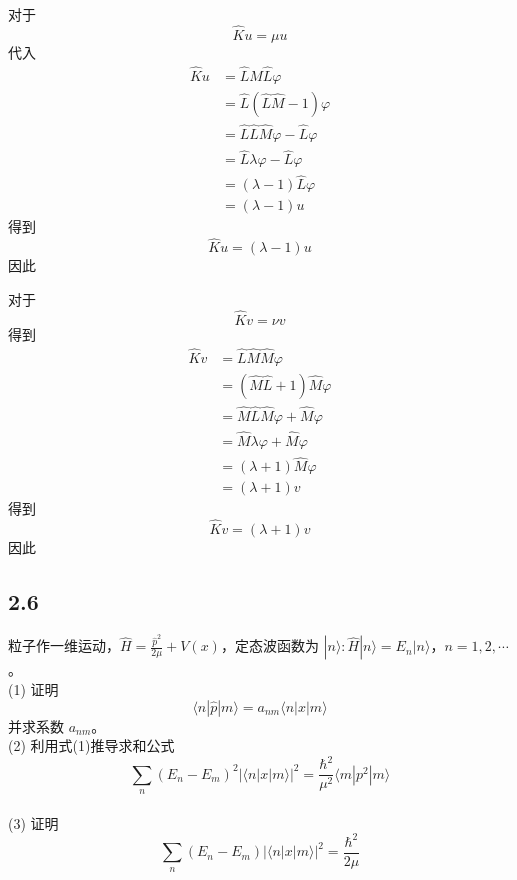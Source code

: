 对于
\begin{equation}
    \hat{K}u=\mu u
\end{equation}
代入
\begin{equation}
    \begin{aligned}
        \hat{K}u&=\hat{L}\hat{M}\hat{L}\varphi 
\\
&=\hat{L}\left( \hat{L}\hat{M}-1 \right) \varphi 
\\
&=\hat{L}\hat{L}\hat{M}\varphi -\hat{L}\varphi 
\\
&=\hat{L}\lambda \varphi -\hat{L}\varphi 
\\
&=\left( \lambda -1 \right) \hat{L}\varphi 
\\
&=\left( \lambda -1 \right) u
    \end{aligned}
\end{equation}
得到
\begin{equation}
    \hat{K}u=\left( \lambda -1 \right) u
\end{equation}
因此

对于
\begin{equation}
    \hat{K}v=\nu v
\end{equation}
得到
\begin{equation}
    \begin{aligned}
        \hat{K}v&=\hat{L}\hat{M}\hat{M}\varphi 
\\
&=\left( \hat{M}\hat{L}+1 \right) \hat{M}\varphi 
\\
&=\hat{M}\hat{L}\hat{M}\varphi +\hat{M}\varphi 
\\
&=\hat{M}\lambda \varphi +\hat{M}\varphi 
\\
&=\left( \lambda +1 \right) \hat{M}\varphi 
\\
&=\left( \lambda +1 \right) v
    \end{aligned}
\end{equation}
得到
\begin{equation}
    \hat{K}v=\left( \lambda +1 \right) v
\end{equation}
因此

\subsection{2.6}
粒子作一维运动，$\hat{H} = \frac{\hat{p}^2}{2\mu} + V(x)$，定态波函数为 $|n\rangle : \hat{H}|n\rangle = E_n |n\rangle$，$n = 1, 2, \cdots$。
\\(1) 证明
$$\langle n | \hat{p} | m \rangle = a_{nm} \langle n | x | m \rangle \tag{1}$$
并求系数 $a_{nm}$。
\\(2) 利用式(1)推导求和公式
$$\sum_n (E_n - E_m)^2 | \langle n | x | m \rangle |^2 = \frac{\hbar^2}{\mu^2} \langle m | p^2 | m \rangle \tag{2}$$
\\(3) 证明
$$\sum_n (E_n - E_m) | \langle n | x | m \rangle |^2 = \frac{\hbar^2}{2\mu} \tag{3}$$

